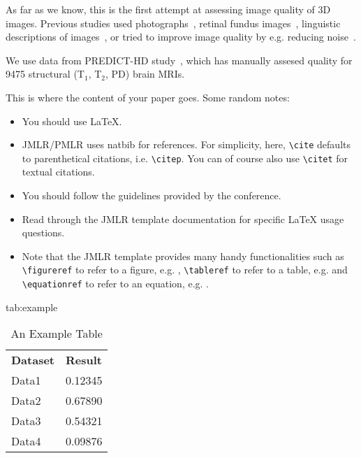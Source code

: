 \documentclass{midl} %
\begin{document}

As far as we know, this is the first attempt at assessing image quality of 3D images. Previous studies used photographs~\cite{bosse2017deep,bianco2018use,hosu2020koniq}, retinal fundus images~\cite{yu2017image}, linguistic descriptions of images~\cite{hou2014blind}, or tried to improve image quality by e.g. reducing noise~\cite{higaki2019improvement}.

We use data from PREDICT-HD study~\cite{paulsen2014clinical}, which has manually assesed quality for 9475 structural (T$_1$, T$_2$, PD) brain MRIs.

This is where the content of your paper goes.  Some random notes:
\begin{itemize}
\item You should use \LaTeX \cite{Lamport:Book:1989}.
\item JMLR/PMLR uses natbib for references. For simplicity, here, \verb|\cite|  defaults to
  parenthetical citations, i.e. \verb|\citep|. You can of course also
  use \verb|\citet| for textual citations.
\item You should follow the guidelines provided by the conference.
\item Read through the JMLR template documentation for specific \LaTeX
  usage questions.
\item Note that the JMLR template provides many handy functionalities
such as \verb|\figureref| to refer to a figure,
e.g. ,  \verb|\tableref| to refer to a table,
e.g.  and \verb|\equationref| to refer to an equation,
e.g. .
\end{itemize}

\begin{table}[htbp]
\floatconts
  {tab:example}%
  {\caption{An Example Table}}%
  {\begin{tabular}{ll}
  \bfseries Dataset & \bfseries Result\\
  Data1 & 0.12345\\
  Data2 & 0.67890\\
  Data3 & 0.54321\\
  Data4 & 0.09876
  \end{tabular}}
\end{table}
\end{document}
